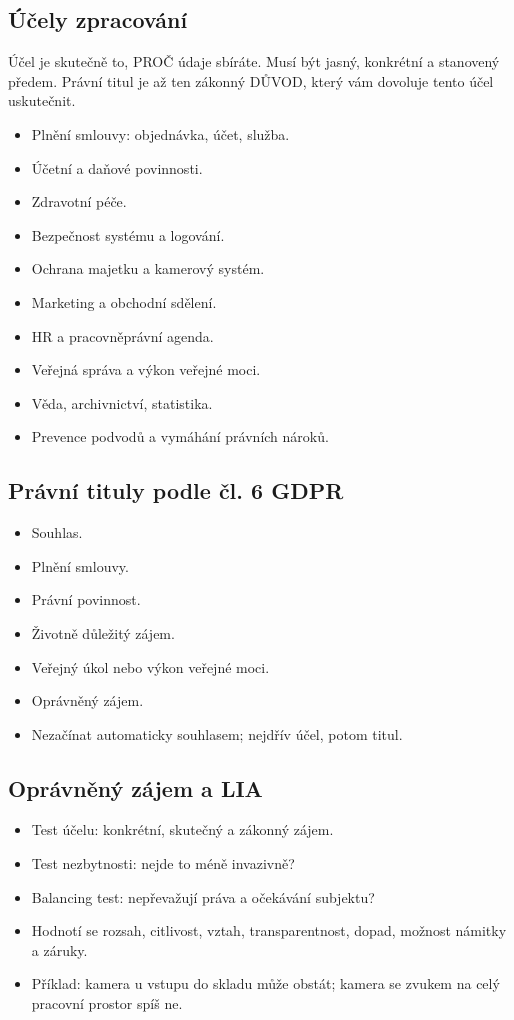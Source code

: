 \documentclass[10pt,a4paper]{article}
\newcommand{\blok}[1]{\subsection*{#1}}
\begin{document}
\blok{Účely zpracování}
Účel je skutečně to, PROČ údaje sbíráte. Musí být jasný, konkrétní a stanovený předem. Právní titul je až ten zákonný DŮVOD, který vám dovoluje tento účel uskutečnit.
\begin{itemize}
  \item Plnění smlouvy: objednávka, účet, služba.
  \item Účetní a daňové povinnosti.
  \item Zdravotní péče.
  \item Bezpečnost systému a logování.
  \item Ochrana majetku a kamerový systém.
  \item Marketing a obchodní sdělení.
  \item HR a pracovněprávní agenda.
  \item Veřejná správa a výkon veřejné moci.
  \item Věda, archivnictví, statistika.
  \item Prevence podvodů a vymáhání právních nároků.
\end{itemize}

\blok{Právní tituly podle čl. 6 GDPR}
\begin{itemize}
  \item Souhlas.
  \item Plnění smlouvy.
  \item Právní povinnost.
  \item Životně důležitý zájem.
  \item Veřejný úkol nebo výkon veřejné moci.
  \item Oprávněný zájem.
  \item Nezačínat automaticky souhlasem; nejdřív účel, potom titul.
\end{itemize}

\blok{Oprávněný zájem a LIA}
\begin{itemize}
  \item Test účelu: konkrétní, skutečný a zákonný zájem.
  \item Test nezbytnosti: nejde to méně invazivně?
  \item Balancing test: nepřevažují práva a očekávání subjektu?
  \item Hodnotí se rozsah, citlivost, vztah, transparentnost, dopad, možnost námitky a záruky.
  \item Příklad: kamera u vstupu do skladu může obstát; kamera se zvukem na celý pracovní prostor spíš ne.
\end{itemize}
\end{document}
